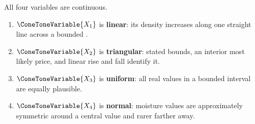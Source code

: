 	All four variables are continuous.
	\begin{enumerate}
		\item $\ConeToneVariable{X_1}$ is \textbf{linear}: its density increases along one straight line across a bounded .
		\item $\ConeToneVariable{X_2}$ is \textbf{triangular}: stated bounds, an interior most likely price, and linear rise and fall identify it.
		\item $\ConeToneVariable{X_3}$ is \textbf{uniform}: all real values in a bounded interval are equally plausible.
		\item $\ConeToneVariable{X_4}$ is \textbf{normal}: moisture values are approximately symmetric around a central value and rarer farther away.
	\end{enumerate}




